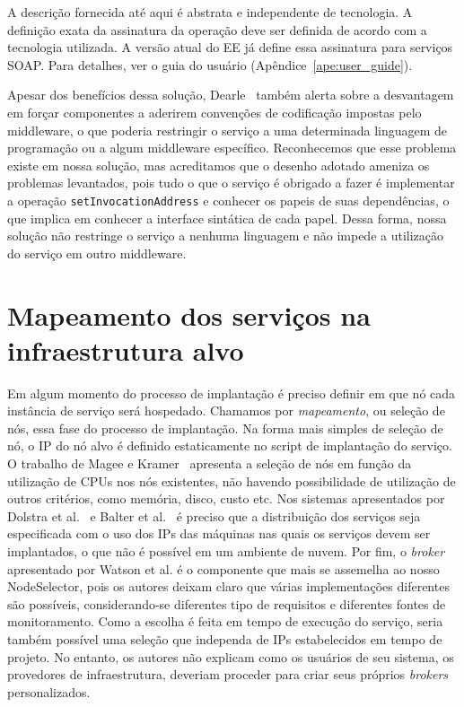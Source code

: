 A descrição fornecida até aqui é abstrata e independente de tecnologia.
A definição exata da assinatura da operação deve ser definida de acordo com a tecnologia utilizada.
A versão atual do EE já define essa assinatura para serviços SOAP.
Para detalhes, ver o guia do usuário (Apêndice~\ref{ape:user_guide}).

Apesar dos benefícios dessa solução, Dearle~\cite{Dearle2007PastPresentFuture} também alerta sobre a desvantagem em forçar componentes a aderirem convenções de codificação impostas pelo middleware, o que poderia restringir o serviço a uma determinada linguagem de programação ou a algum middleware específico. Reconhecemos que esse problema existe em nossa solução, mas acreditamos que o desenho adotado ameniza os problemas levantados, pois tudo o que o serviço é obrigado a fazer é implementar a operação \texttt{setInvocationAddress} e conhecer os papeis de suas dependências, o que implica em conhecer a interface sintática de cada papel. Dessa forma, nossa solução não restringe o serviço a nenhuma linguagem e não impede a utilização do serviço em outro middleware.

\section{Mapeamento dos serviços na infraestrutura alvo}
\label{sec:mapeamento}

Em algum momento do processo de implantação é preciso definir em que nó cada instância de serviço será hospedado.
Chamamos por \emph{mapeamento}, ou seleção de nós, essa fase do processo de implantação.
Na forma mais simples de seleção de nó, o IP do nó alvo é definido estaticamente no script de implantação do serviço.
O trabalho de Magee e Kramer~\cite{Magee1997Corba} apresenta a seleção de nós em função da utilização de CPUs nos nós existentes, não havendo possibilidade de utilização de outros critérios, como memória, disco, custo etc. Nos sistemas apresentados por Dolstra et al.~\cite{Dolstra2005Configuration} e Balter et al.~\cite{Balter1998Olan} é preciso que a distribuição dos serviços seja especificada com o uso dos IPs das máquinas nas quais os serviços devem ser implantados, o que não é possível em um ambiente de nuvem. Por fim, o \emph{broker} apresentado por Watson et al. é o componente que mais se assemelha ao nosso NodeSelector, pois os autores deixam claro que várias implementações diferentes são possíveis, considerando-se diferentes tipo de requisitos e diferentes fontes de monitoramento. Como a escolha é feita em tempo de execução do serviço, seria também possível uma seleção que independa de IPs estabelecidos em tempo de projeto. No entanto, os autores não explicam como os usuários de seu sistema, os provedores de infraestrutura, deveriam proceder para criar seus próprios \emph{brokers} personalizados.

